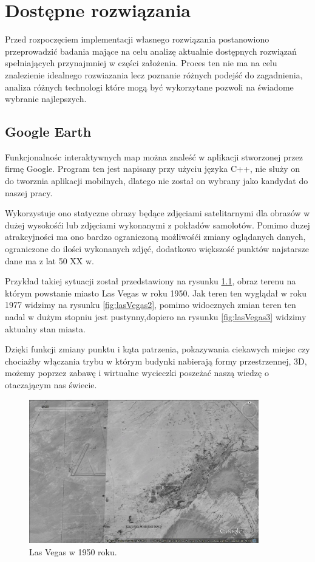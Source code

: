 ﻿\chapter{Dostępne rozwiązania}
\label{sec:dostepnerozwiazania}

Przed rozpoczęciem implementacji własnego rozwiązania postanowiono przeprowadzić badania mające na celu analizę aktualnie dostępnych rozwiązań spełniających przynajmniej w części założenia. Proces ten nie ma na celu znalezienie idealnego rozwiazania lecz poznanie różnych podejść do zagadnienia, analiza różnych technologi które mogą być wykorzytane pozwoli na świadome wybranie najlepszych. 


\section{Google Earth}
\label{sec:Google Earth}

Funkcjonalnośc interaktywnych map można znaleść w aplikacji stworzonej przez firmę Google. Program ten jest napisany przy użyciu języka C++, nie służy on do tworznia aplikacji mobilnych, dlatego nie został on wybrany jako kandydat do naszej pracy.

Wykorzystuje ono statyczne obrazy będące zdjęciami satelitarnymi dla obrazów w dużej wysokośći lub zdjęciami wykonanymi z pokładów samolotów. Pomimo duzej atrakcyjności ma ono bardzo ograniczoną możliwośći zmiany oglądanych danych, ograniczone do ilości wykonanych zdjęć, dodatkowo większość punktów najstarsze dane ma z lat 50 XX w.

Przykład takiej sytuacji został przedstawiony na rysunku \ref{fig:lasVegas1}, obraz terenu na którym powstanie miasto Las Vegas w roku 1950. Jak teren ten wyglądał w roku 1977 widzimy na rysunku \ref{fig:lasVegas2}, pomimo widocznych zmian teren ten nadal w dużym stopniu jest pustynny,dopiero na rysunku \ref{fig:lasVegas3} widzimy aktualny stan miasta.

Dzięki funkcji zmiany punktu i kąta patrzenia, pokazywania ciekawych miejsc czy chociażby włączania trybu w którym budynki nabierają formy przestrzennej, 3D, możemy poprzez zabawę i wirtualne wycieczki poszeżać naszą wiedzę o otaczającym nas świecie.


\begin{figure}[H]
  \centering
    \includegraphics[width=100mm]{ge/01_1950.jpg}
  \caption{Las Vegas w 1950 roku.}
  \label{fig:lasVegas1}
\end{figure}

